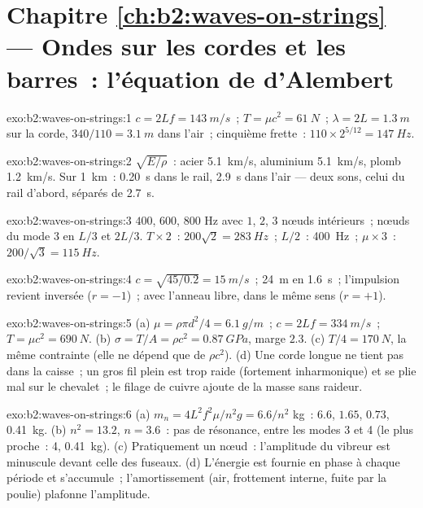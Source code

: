 \section*{Chapitre \ref{ch:b2:waves-on-strings} --- Ondes sur les cordes et les barres~: l'équation de d'Alembert}

\begin{solution}{exo:b2:waves-on-strings:1}
$c = 2Lf = \qty{143}{m/s}$~; $T = \mu c^2 = \qty{61}{N}$~; $\lambda = 2L = \qty{1.3}{m}$ sur la
corde, $340/110 = \qty{3.1}{m}$ dans l'air~; cinquième frette~: $110 \times 2^{5/12} =
\qty{147}{Hz}$.
\end{solution}

\begin{solution}{exo:b2:waves-on-strings:2}
$\sqrt{E/\rho}$~: acier \qty{5.1}{km/s}, aluminium \qty{5.1}{km/s}, plomb
\qty{1.2}{km/s}. Sur \qty{1}{km}~: \qty{0.20}{s} dans le rail, \qty{2.9}{s} dans l'air ---
deux sons, celui du rail d'abord, séparés de \qty{2.7}{s}.
\end{solution}

\begin{solution}{exo:b2:waves-on-strings:3}
$400$, $600$, $800$ Hz avec $1$, $2$, $3$ nœuds intérieurs~; nœuds du mode 3 en
$L/3$ et $2L/3$. $T \times 2$~: $200\sqrt2 = \qty{283}{Hz}$~; $L/2$~: \qty{400}{Hz}~; $\mu
\times 3$~: $200/\sqrt3 = \qty{115}{Hz}$.
\end{solution}

\begin{solution}{exo:b2:waves-on-strings:4}
$c = \sqrt{45/0.2} = \qty{15}{m/s}$~; \qty{24}{m} en \qty{1.6}{s}~; l'impulsion revient
inversée ($r = -1$)~; avec l'anneau libre, dans le même sens ($r = +1$).
\end{solution}

\begin{solution}{exo:b2:waves-on-strings:5}
(a) $\mu = \rho\pi d^2/4 = \qty{6.1}{g/m}$~; $c = 2Lf = \qty{334}{m/s}$~; $T = \mu c^2 =
\qty{690}{N}$. (b) $\sigma = T/A = \rho c^2 = \qty{0.87}{GPa}$, marge $2.3$. (c) $T/4 =
\qty{170}{N}$, la même contrainte (elle ne dépend que de $\rho c^2$). (d) Une corde
longue ne tient pas dans la caisse~; un gros fil plein est trop raide (fortement
inharmonique) et se plie mal sur le chevalet~; le filage de cuivre ajoute de la masse
sans raideur.
\end{solution}

\begin{solution}{exo:b2:waves-on-strings:6}
(a) $m_n = 4L^2f^2\mu/n^2g = 6.6/n^2$ kg~: $6.6$, $1.65$, $0.73$, \qty{0.41}{kg}. (b)
$n^2 = 13.2$, $n = 3.6$~: pas de résonance, entre les modes 3 et 4 (le plus proche~: 4,
\qty{0.41}{kg}). (c) Pratiquement un nœud~: l'amplitude du vibreur est minuscule
devant celle des fuseaux. (d) L'énergie est fournie en phase à chaque période et
s'accumule~; l'amortissement (air, frottement interne, fuite par la
poulie) plafonne l'amplitude.
\end{solution}

